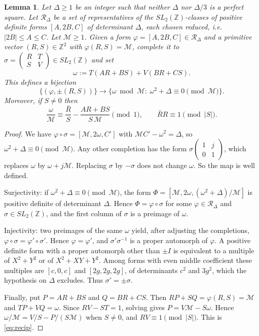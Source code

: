\documentclass[11pt]{amsart}
\newtheorem{lemma}[theorem]{Lemma}
\theoremstyle{remark}
\theoremstyle{definition}
\numberwithin{equation}{section}
\newcommand{\Z}{\mathbb{Z}}
\begin{document}
\begin{lemma}\label{lem:gauss}
Let $\Delta\ge1$ be an integer such that neither $\Delta$ nor $\Delta/3$ is a perfect square. Let $\mathcal R_\Delta$ be a set of representatives of the $SL_2(\Z)$-classes of positive definite forms $[A,2B,C]$ of determinant $\Delta$, each chosen reduced, i.e.\ $|2B|\le A\le C$. Let $\mathcal M\ge1$. Given a form $\varphi=[A,2B,C]\in\mathcal R_\Delta$ and a primitive vector $(R,S)\in\Z^2$ with $\varphi(R,S)=\mathcal M$, complete it to $\sigma=\left(\begin{smallmatrix}R&T\\ S&V\end{smallmatrix}\right)\in SL_2(\Z)$ and set
\[
\omega:=T(AR+BS)+V(BR+CS).
\]
This defines a bijection
\[
\bigl\{(\varphi,\pm(R,S))\bigr\}\longrightarrow\bigl\{\omega\bmod\mathcal M:\ \omega^2+\Delta\equiv0\pmod{\mathcal M}\bigr\}.
\]
Moreover, if $S\neq0$ then
\begin{equation}\label{eq:recip}
\frac{\omega}{\mathcal M}\equiv\frac{\bar R}{S}-\frac{AR+BS}{S\,\mathcal M}\pmod 1,\qquad \bar R R\equiv 1\pmod{|S|}.
\end{equation}
\end{lemma}

\begin{proof}
We have $\varphi\circ\sigma=[\mathcal M,2\omega,C']$ with $\mathcal MC'-\omega^2=\Delta$, so $\omega^2+\Delta\equiv0\pmod{\mathcal M}$. Any other completion has the form $\sigma\left(\begin{smallmatrix}1&j\\0&1\end{smallmatrix}\right)$, which replaces $\omega$ by $\omega+j\mathcal M$. Replacing $\sigma$ by $-\sigma$ does not change $\omega$. So the map is well defined.

Surjectivity: if $\omega^2+\Delta\equiv0\pmod{\mathcal M}$, the form $\Phi=[\mathcal M,2\omega,(\omega^2+\Delta)/\mathcal M]$ is positive definite of determinant $\Delta$. Hence $\Phi=\varphi\circ\sigma$ for some $\varphi\in\mathcal R_\Delta$ and $\sigma\in SL_2(\Z)$, and the first column of $\sigma$ is a preimage of $\omega$.

Injectivity: two preimages of the same $\omega$ yield, after adjusting the completions, $\varphi\circ\sigma=\varphi'\circ\sigma'$. Hence $\varphi=\varphi'$, and $\sigma'\sigma^{-1}$ is a proper automorph of $\varphi$. A positive definite form with a proper automorph other than $\pm I$ is equivalent to a multiple of $X^2+Y^2$ or of $X^2+XY+Y^2$. Among forms with even middle coefficient these multiples are $[c,0,c]$ and $[2g,2g,2g]$, of determinants $c^2$ and $3g^2$, which the hypothesis on $\Delta$ excludes. Thus $\sigma'=\pm\sigma$.

Finally, put $P=AR+BS$ and $Q=BR+CS$. Then $RP+SQ=\varphi(R,S)=\mathcal M$ and $TP+VQ=\omega$. Since $RV-ST=1$, solving gives $P=V\mathcal M-S\omega$. Hence $\omega/\mathcal M=V/S-P/(S\mathcal M)$ when $S\ne0$, and $RV\equiv1\pmod{|S|}$. This is \eqref{eq:recip}.
\end{proof}
\end{document}
